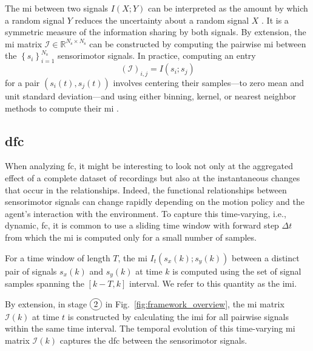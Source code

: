 The \ac{mi} between two signals $I\left(X;Y\right)$ can be interpreted as the amount by which a random signal $ Y $ reduces the uncertainty about a random signal $ X $ \cite{Cover1999Elementsinformationtheory}. It is a symmetric measure of the information sharing by both signals. By extension, the \ac{mi} matrix $\bm{\mathcal{I}} \in \mathbb{R}^{{N_\text{s}} \times {N_\text{s}}}$ can be constructed by computing the pairwise \ac{mi} between the $\left\lbrace s_i\right\rbrace^{N_\text{s}}_{i=1}$ sensorimotor signals. In practice, computing an entry
\begin{equation}\label{eq:adjacency_mi}
	\left(\bm{\mathcal{I}}\right)_{i,j} = I(s_i;s_j)
\end{equation}
for a pair $\left({s}_i(t),{s}_j(t)\right)$ involves centering their samples---to zero mean and unit standard deviation---and using either binning, kernel, or nearest neighbor methods to compute their \ac{mi} \cite{WaltersWilliams2009Estimationmutualinformation}.

\subsection{\Acl{dfc}}
When analyzing \ac{fc}, it might be interesting to look not only at the aggregated effect of a complete dataset of recordings but also at the instantaneous changes that occur in the relationships. Indeed, the functional relationships between sensorimotor signals can change rapidly depending on the motion policy and the agent's interaction with the environment. To capture this time-varying, i.e., dynamic, \acl{fc}, it is common to use a sliding time window \cite{Preti2017dynamicfunctionalconnectome} with forward step $\Delta t$ from which the \ac{mi} is computed only for a small number of samples.

For a time window of length $T$, the \ac{mi} $I_t(s_x(k);s_y(k))$ between a distinct pair of signals $s_x(k)$ and $s_y(k)$ at time $k$ is computed using the set of signal samples spanning the $\left[k-T,k\right]$ interval. We refer to this quantity as the \acf{imi}. 

By extension, in stage $\circled{2}$ in Fig.~\ref{fig:framework_overview}, the \ac{mi} matrix $\bm{\mathcal{I}}(k)$ at time $t$ is constructed by calculating the \ac{imi} for all pairwise signals within the same time interval. The temporal evolution of this time-varying \ac{mi} matrix $\bm{\mathcal{I}}(k)$ captures the \ac{dfc} between the sensorimotor signals.

